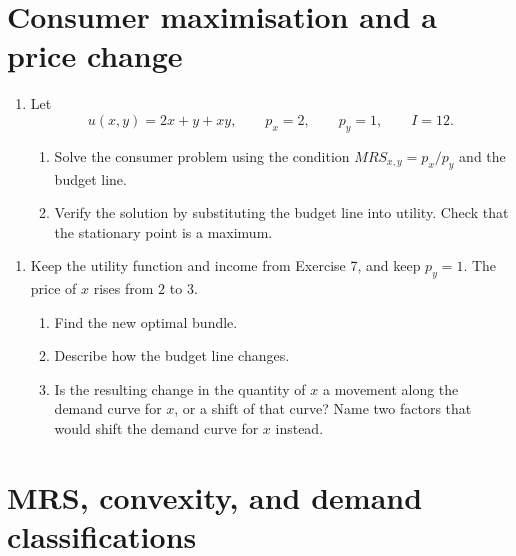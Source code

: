 \documentclass[11pt,a4paper]{article}
\begin{document}
\section{Consumer maximisation and a price change}

\begin{enumerate}[label=\textbf{7.\alph*}]
  \item Let
  \[
    u(x,y)=2x+y+xy,
    \qquad
    p_x=2,
    \qquad
    p_y=1,
    \qquad
    I=12.
  \]
  \begin{enumerate}[label=(\roman*)]
    \item Solve the consumer problem using the condition
    \(MRS_{x,y}=p_x/p_y\) and the budget line.
    \item Verify the solution by substituting the budget line into utility.
    Check that the stationary point is a maximum.
  \end{enumerate}
\end{enumerate}

\begin{enumerate}[label=\textbf{8.\alph*}]
  \item Keep the utility function and income from Exercise 7, and keep
  \(p_y=1\). The price of \(x\) rises from \(2\) to \(3\).
  \begin{enumerate}[label=(\roman*)]
    \item Find the new optimal bundle.
    \item Describe how the budget line changes.
    \item Is the resulting change in the quantity of \(x\) a movement along
    the demand curve for \(x\), or a shift of that curve? Name two factors
    that would shift the demand curve for \(x\) instead.
  \end{enumerate}
\end{enumerate}

\section{MRS, convexity, and demand classifications}
\end{document}
